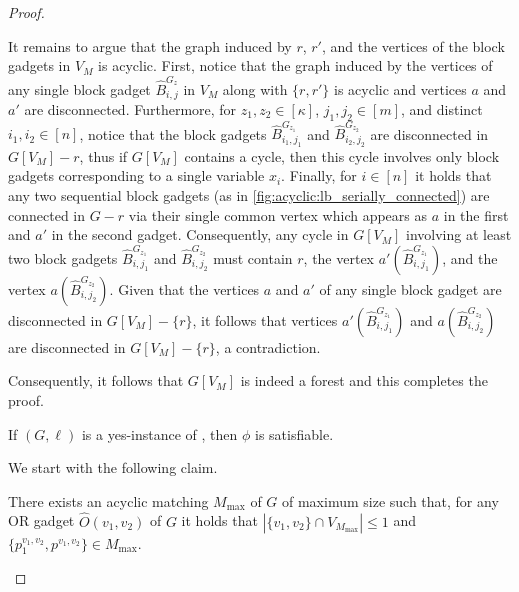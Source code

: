 \begin{proof}
\begin{nestedproof}
            It remains to argue that the graph induced by $r$, $r'$, and the vertices of the block gadgets in $V_M$ is acyclic.
            First, notice that the graph induced by the vertices of any single block gadget $\hat{B}^{G_z}_{i,j}$ in $V_M$ along with $\{r,r'\}$
            is acyclic and vertices $a$ and $a'$ are disconnected.
            Furthermore, for $z_1,z_2 \in [\kappa]$, $j_1, j_2 \in [m]$, and distinct $i_1,i_2 \in [n]$,
            notice that the block gadgets $\hat{B}^{G_{z_1}}_{i_1,j_1}$ and $\hat{B}^{G_{z_2}}_{i_2,j_2}$
            are disconnected in $G[V_M] - r$, thus if $G[V_M]$ contains a cycle, then this cycle involves only block gadgets
            corresponding to a single variable $x_i$.
            Finally, for $i \in [n]$ it holds that any two sequential block gadgets (as in \cref{fig:acyclic:lb_serially_connected})
            are connected in $G - r$ via their single common vertex which appears as $a$ in the first and $a'$ in the second gadget.
            Consequently, any cycle in $G[V_M]$ involving at least two block gadgets $\hat{B}^{G_{z_1}}_{i,j_1}$ and $\hat{B}^{G_{z_2}}_{i,j_2}$
            must contain $r$, the vertex $a' (\hat{B}^{G_{z_1}}_{i,j_1})$, and the vertex $a (\hat{B}^{G_{z_2}}_{i,j_2})$.
            Given that the vertices $a$ and $a'$ of any single block gadget are disconnected in $G[V_M] - \{r\}$,
            it follows that vertices $a' (\hat{B}^{G_{z_1}}_{i,j_1})$ and $a (\hat{B}^{G_{z_2}}_{i,j_2})$
            are disconnected in $G[V_M] - \{r\}$, a contradiction.

            Consequently, it follows that $G[V_M]$ is indeed a forest and this completes the proof.
        \end{nestedproof}

        \begin{lemma}\label{lem:acyclic:lb:acyclic->csp}
            If $(G,\ell)$ is a yes-instance of \AcyclicM,
            then $\phi$ is satisfiable.
        \end{lemma}

        \begin{nestedproof}

            We start with the following claim.

            \begin{claim}\label{claim:acyclic:lb:acyclic->csp:maximum_matching}
                There exists an acyclic matching $M_{\max}$ of $G$ of maximum size such that,
                for any OR gadget $\hat{O}(v_1,v_2)$ of $G$ it holds that $|\{v_1,v_2\} \cap V_{M_{\max}}| \le 1$
                and $\{p^{v_1,v_2}_1,p^{v_1,v_2}\} \in M_{\max}$.
            \end{claim}


\end{nestedproof}
\end{proof}
